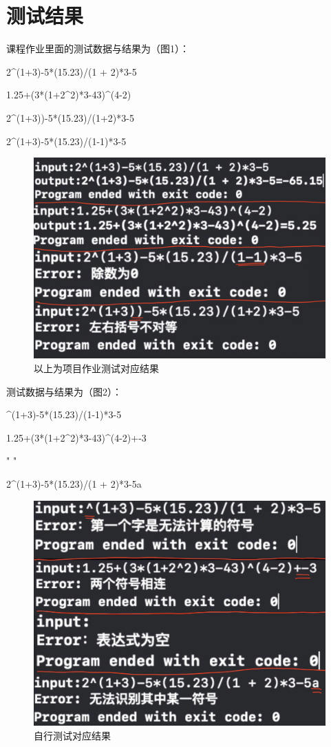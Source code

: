 \documentclass{article}
\begin{document}
\section{测试结果}
课程作业里面的测试数据与结果为（图1）：\par
2\^{}(1+3)-5*(15.23)/(1 + 2)*3-5 \par
1.25+(3*(1+2\^{}2)*3-43)\^{}(4-2) \par
2\^{}(1+3))-5*(15.23)/(1+2)*3-5\par
2\^{}(1+3)-5*(15.23)/(1-1)*3-5\par
\begin{figure}[H]
		\centering
		\includegraphics[scale=0.21]{test pic1.png}	
            \caption{以上为项目作业测试对应结果}
\end{figure}\par
测试数据与结果为（图2）：\par
\^{}(1+3)-5*(15.23)/(1-1)*3-5\par
1.25+(3*(1+2\^{}2)*3-43)\^{}(4-2)+-3\par
" " \par
2\^{}(1+3)-5*(15.23)/(1 + 2)*3-5a\par
\begin{figure}[H]
		\centering
		\includegraphics[scale=0.21]{test pic2.png}	
            \caption{自行测试对应结果}
\end{figure}\par
\end{document}
